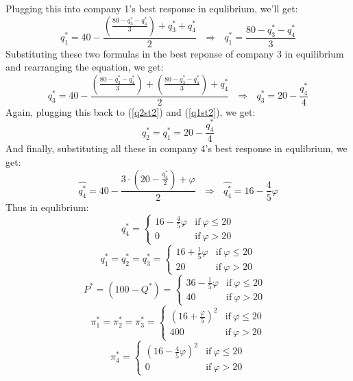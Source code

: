 \documentclass[10pt,a4paper]{article}
\begin{document}
Plugging this into company 1's best response in equlibrium, we'll get:
\begin{equation}
	\label{q1st2}
	q_1^* = 40 - \frac{\left( \frac{80-q_3^*-q_4^*}{3} \right)+q_3^*+q_4^*}{2} ~~~\Rightarrow~~~ q_1^*=\frac{80-q_3^*-q_4^*}{3}
\end{equation}
Substituting these two formulas in the best reponse of company 3 in equilibrium and rearranging the equation, we get:
\begin{equation}
	\label{q3st3}
	q_3^*=40-\frac{\left( \frac{80-q_3^*-q_4^*}{3} \right)+\left( \frac{80-q_3^*-q_4^*}{3} \right) + q_4^*}{2} ~~~\Rightarrow~~~ q_3^*=20-\frac{q_4^*}{4}
\end{equation}
Again, plugging this back to (\ref{q2st2}) and (\ref{q1st2}), we get:
\begin{equation}
	\label{q12st3}
	q_2^* = q_1^*=20-\frac{q_4^*}{4}
\end{equation}
And finally, substituting all these in company 4's best response in equlibrium, we get:
\begin{equation}
	\widehat{q_4^*}=40-\frac{3 \cdot \left( 20-\frac{q_4^*}{2} \right)+\varphi}{2} ~~~\Rightarrow~~~ \widehat{q_4^*} = 16-\frac{4}{5} \varphi
\end{equation}
Thus in equlibrium:
\begin{equation}
	q_4^* =
	\begin{cases}
		16-\frac45 \varphi & \text{if} ~ \varphi \leq 20 \\
		0 & \text{if} ~ \varphi > 20
	\end{cases}
\end{equation}
\begin{equation}
	q_1^* = q_2^* = q_3^* =
	\begin{cases}
		16+\frac15 \varphi & \text{if} ~ \varphi \leq 20 \\
		20 & \text{if} ~ \varphi > 20
	\end{cases}
\end{equation}
\begin{equation}
	P^* = (100-Q^*)=
	\begin{cases}
		36-\frac15 \varphi & \text{if} ~ \varphi \leq 20 \\
		40 & \text{if} ~ \varphi > 20
	\end{cases}
	~~~
\end{equation}
\begin{equation}
	\pi_1^*=\pi_2^*=\pi_3^* =
	\begin{cases}
		\left( 16+\frac{\varphi}{5} \right)^2 & \text{if} ~ \varphi \leq 20 \\
		400 & \text{if} ~ \varphi > 20
	\end{cases}
\end{equation}
\begin{equation}
	\label{pi4a}
	\pi_4^*=
	\begin{cases}
		\left( 16-\frac{4}{5}\varphi \right)^2 & \text{if} ~ \varphi \leq 20 \\
		0 & \text{if} ~ \varphi > 20
	\end{cases}	
\end{equation}
\end{document}
